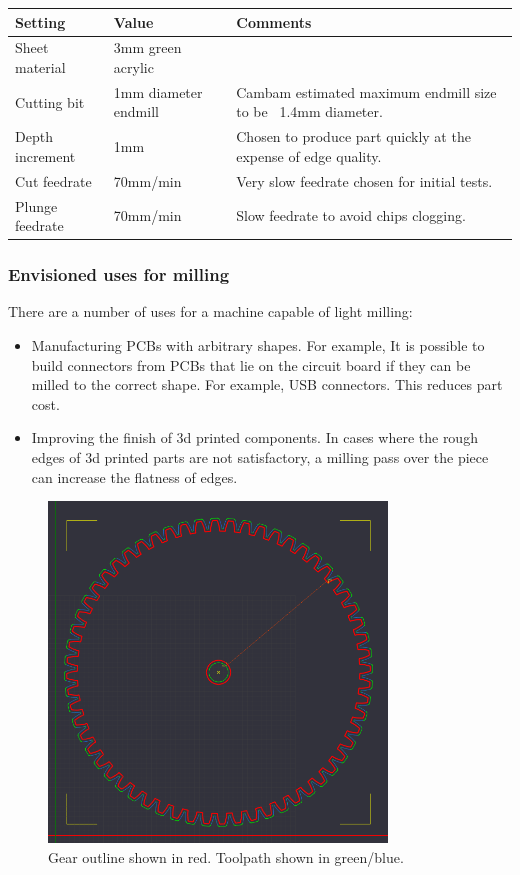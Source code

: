 \begin{center}
	\begin{tabular}{| l | l | p{8cm} |}
	\hline
	Setting & Value & Comments \\ \hline
	Sheet material & 3mm green acrylic & \\ \hline
	Cutting bit & 1mm diameter endmill & Cambam estimated maximum endmill size to be ~1.4mm diameter. \\ \hline
	Depth increment & 1mm & Chosen to produce part quickly at the expense of edge quality. \\ \hline
	Cut feedrate & 70mm/min & Very slow feedrate chosen for initial tests. \\ \hline
	Plunge feedrate & 70mm/min & Slow feedrate to avoid chips clogging.\\
	\hline
	\end{tabular}
\end{center}

\subsubsection {Envisioned uses for milling}
{
There are a number of uses for a machine capable of light milling:

\begin{itemize} \itemsep0em
	\item	Manufacturing PCBs with arbitrary shapes. For example, It is possible to build connectors from PCBs that lie on the circuit board if they can be milled to the correct shape.
			For example, USB connectors. This reduces part cost.
	\item	Improving the finish of 3d printed components. In cases where the rough edges of 3d printed parts are not satisfactory, a milling pass over the piece can increase the flatness
			of edges.
	
\end{itemize}
}

\begin{figure}[ht!]
\centering
\includegraphics[width=90mm]{resources/gear_cambam.png}
\caption{Gear outline shown in red. Toolpath shown in green/blue.}
\label{overflow}
\end{figure}

